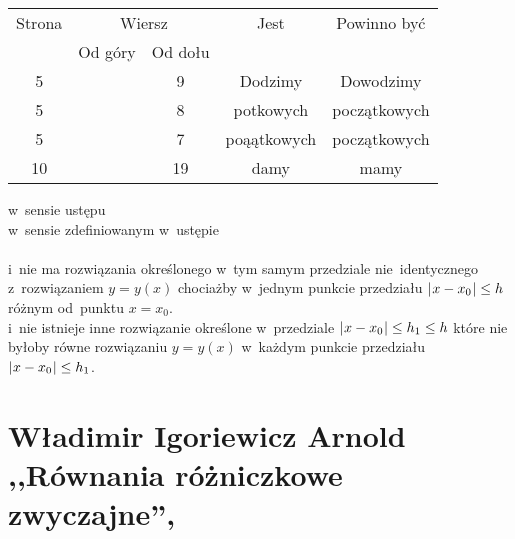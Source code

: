 \documentclass[a4paper,11pt]{article}
\numberwithin{equation}{section}
\begin{document}
\begin{center}

  \begin{tabular}{|c|c|c|c|c|}
    \hline
    Strona & \multicolumn{2}{c|}{Wiersz} & Jest
                              & Powinno być \\ \cline{2-3}
    & Od góry & Od dołu & & \\
    \hline
    5   & &  9 & Dodzimy & Dowodzimy \\
    5   & &  8 & potkowych & początkowych \\
    5   & &  7 & poąątkowych & początkowych \\
    10  & & 19 & damy & mamy \\
    \hline
  \end{tabular}

\end{center}

\VerSpaceSix


\noindent
{}
\Jest w~sensie ustępu \\
\PowinnoByc w~sensie zdefiniowanym w~ustępie \\
 \\
\Jest i~nie ma rozwiązania określonego w~tym samym przedziale
nie~identycznego z~rozwiązaniem $y = y( x )$ chociażby w~jednym
punkcie przedziału $| \hspace{0.05em}  x - x_{ 0 }  \hspace{0.05em} | \leq h$ różnym
od~punktu $x = x_{ 0 }$. \\
\PowinnoByc i~nie istnieje inne rozwiązanie określone w~przedziale
$| \hspace{0.05em}  x - x_{ 0 }  \hspace{0.05em} | \leq h_{ 1 } \leq h$ które nie byłoby równe
rozwiązaniu $y = y( x )$ w~każdym punkcie przedziału
$| \hspace{0.05em}  x - x_{ 0 }  \hspace{0.05em} | \leq h_{ 1 }$. \\








\section{ %
  Władimir Igoriewicz Arnold \\
  ,,Równania różniczkowe zwyczajne'', \cite{} }
\end{document}
